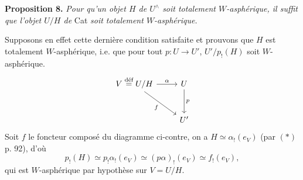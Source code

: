 \textbf{Proposition 8.} \textit{Pour qu'un objet $H$ de $U^{\wedge}$ soit totalement $W$-asphérique, il suffit que l'objet $U/H$ de} Cat \textit{soit totalement $W$-asphérique.}

Supposons en effet cette dernière condition satisfaite et prouvons que $H$ est totalement $W$-asphérique, i.e. que pour tout $p : U \longrightarrow U'$, $U'/p_!(H)$ soit $W$-asphérique.
\[
\begin{tikzcd}[row sep=large]
V \defeq U/H \arrow[r, "\alpha"] \arrow[dr, "f"'] & U \arrow[d, "p"] \\
 & U'
\end{tikzcd}
\]
Soit $f$ le foncteur composé du diagramme ci-contre, on a $H \simeq \alpha_!(e_V)$ (par $(*)$ p. 92), d'où
\[ p_!(H) \simeq p_!\alpha_!(e_V) \simeq (p\alpha)_!(e_V) \simeq f_!(e_V), \]
qui est $W$-asphérique par hypothèse sur $V = U/H$.

